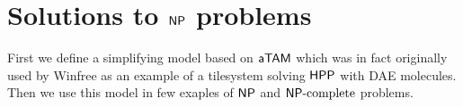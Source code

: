 \chapter{Solutions to $\mathsf{NP}$ problems}   %
\label{chap:problems}




First we define a simplifying model based on $\mathsf{aTAM}$ which was in fact originally used by Winfree \cite{winfree_phd} as an example of a tilesystem solving $\sf HPP$ with DAE molecules. Then we use this model in few exaples of $\mathsf{NP}$ and $\mathsf{NP}\textnormal{-complete}$ problems.








